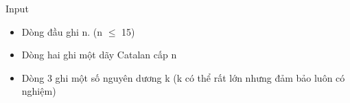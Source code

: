 Input
\begin{itemize}
	\item Dòng đầu ghi n. (n  $\le$  15)
	\item Dòng hai ghi một dãy Catalan cấp n
	\item Dòng 3 ghi một số nguyên dương k (k có thể rất lớn nhưng đảm bảo luôn có nghiệm)
\end{itemize}